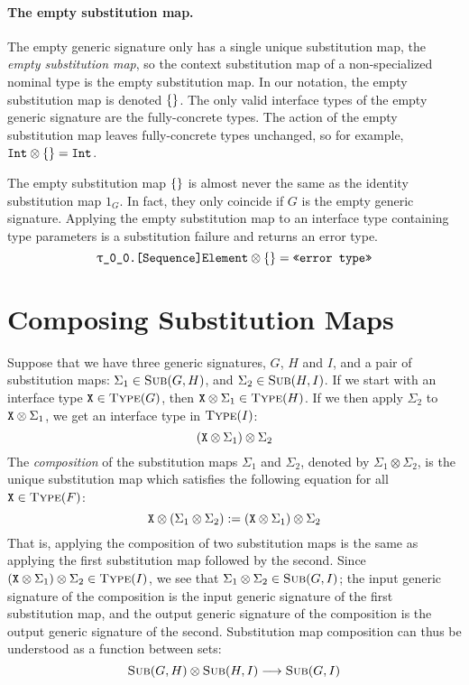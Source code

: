 \documentclass[../generics]{subfiles}
\begin{document}
\paragraph{The empty substitution map.}
The empty generic signature only has a single unique substitution map, the \emph{empty substitution map}, so the context substitution map of a non-specialized nominal type is the empty substitution map. In our notation, the empty substitution map is denoted $\{\}$. The only valid interface types of the empty generic signature are the fully-concrete types. The action of the empty substitution map leaves fully-concrete types unchanged, so for example, $\texttt{Int}\otimes\{\} = \texttt{Int}$.

The empty substitution map $\{\}$ is almost never the same as the identity substitution map $1_G$. In fact, they only coincide if $G$ is the empty generic signature. Applying the empty substitution map to an interface type containing type parameters is a substitution failure and returns an error type.
\[\texttt{\ttgp{0}{0}.[Sequence]Element} \otimes \SubstMap{} = \texttt{<<error type>>}\]

\section{Composing Substitution Maps}\label{submapcomposition}\label{classinheritance}

\iffalse

\SecRef{abstract conformances} talks about composition with root conformances

\fi

Suppose that we have three generic signatures, $G$, $H$ and $I$, and a pair of substitution maps: $\Sigma_1\in\textsc{Sub}({G, H})$, and $\Sigma_2\in\textsc{Sub}({H, I})$. If we start with an interface type $\texttt{X}\in\textsc{Type}({G})$, then $\texttt{X}\otimes\Sigma_1\in\textsc{Type}({H})$. If we then apply $\Sigma_2$ to $\texttt{X}\otimes\Sigma_1$, we get an interface type in $\textsc{Type}({I})$:
\[(\texttt{X}\otimes\Sigma_1)\otimes\Sigma_2\]
The \emph{composition} of the substitution maps $\Sigma_1$ and $\Sigma_2$, denoted by \index{$\otimes$}$\Sigma_1\otimes\Sigma_2$, is the unique substitution map which satisfies the following equation for all $\texttt{X}\in\textsc{Type}({F})$:
\[\texttt{X}\otimes(\Sigma_1\otimes\Sigma_2):=(\texttt{X}\otimes\Sigma_1)\otimes\Sigma_2\]
That is, applying the composition of two substitution maps is the same as applying the first substitution map followed by the second. Since $(\texttt{X}\otimes\Sigma_1)\otimes\Sigma_2\in\textsc{Type}({I})$, we see that $\Sigma_1\otimes\Sigma_2\in\textsc{Sub}({G, I})$; the input generic signature of the composition is the input generic signature of the first substitution map, and the output generic signature of the composition is the output generic signature of the second. Substitution map composition can thus be understood as a function between sets:
\[\textsc{Sub}({G, H})\otimes\textsc{Sub}({H, I})\longrightarrow\textsc{Sub}({G, I})\]
\end{document}
